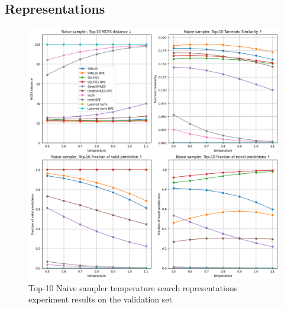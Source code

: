 \subsection*{Representations}
\begin{figure}[H]
    \centering
    \includegraphics[width=1.0\textwidth]{figures/appendix/representations_with_layered_inchi_with_tanimoto.png}
    \caption{Top-10 Naive sampler temperature search representations experiment results on the validation set}
    \label{fig:representations_appendix}
\end{figure}

